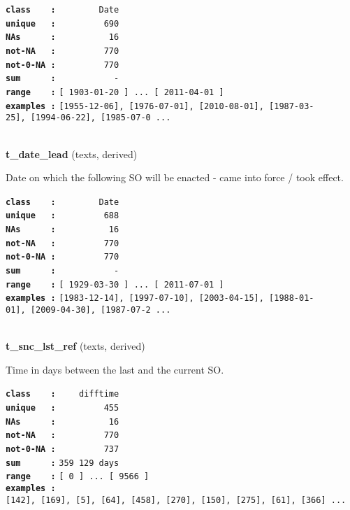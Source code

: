 \documentclass[]{article}
\begin{document}
\textbf{\texttt{class\ \ \ \ :}} \texttt{~~~~~~~~Date}\\
\textbf{\texttt{unique\ \ \ :}} \texttt{~~~~~~~~~690}\\
\textbf{\texttt{NAs\ \ \ \ \ \ :}} \texttt{~~~~~~~~~~16}\\
\textbf{\texttt{not-NA\ \ \ :}} \texttt{~~~~~~~~~770}\\
\textbf{\texttt{not-0-NA\ :}} \texttt{~~~~~~~~~770}\\
\textbf{\texttt{sum\ \ \ \ \ \ :}} \texttt{~~~~~~~~~~~-}\\
\textbf{\texttt{range\ \ \ \ :}}
\texttt{{[}\ 1903-01-20\ {]}\ ...\ {[}\ 2011-04-01\ {]}}\\
\textbf{\texttt{examples\ :}}
\texttt{{[}1955-12-06{]},\ {[}1976-07-01{]},\ {[}2010-08-01{]},\ {[}1987-03-25{]},\ {[}1994-06-22{]},\ {[}1985-07-0\ ...}\\

~

\textbf{t\_date\_lead} (texts, derived)

Date on which the following SO will be enacted - came into force / took
effect.

\textbf{\texttt{class\ \ \ \ :}} \texttt{~~~~~~~~Date}\\
\textbf{\texttt{unique\ \ \ :}} \texttt{~~~~~~~~~688}\\
\textbf{\texttt{NAs\ \ \ \ \ \ :}} \texttt{~~~~~~~~~~16}\\
\textbf{\texttt{not-NA\ \ \ :}} \texttt{~~~~~~~~~770}\\
\textbf{\texttt{not-0-NA\ :}} \texttt{~~~~~~~~~770}\\
\textbf{\texttt{sum\ \ \ \ \ \ :}} \texttt{~~~~~~~~~~~-}\\
\textbf{\texttt{range\ \ \ \ :}}
\texttt{{[}\ 1929-03-30\ {]}\ ...\ {[}\ 2011-07-01\ {]}}\\
\textbf{\texttt{examples\ :}}
\texttt{{[}1983-12-14{]},\ {[}1997-07-10{]},\ {[}2003-04-15{]},\ {[}1988-01-01{]},\ {[}2009-04-30{]},\ {[}1987-07-2\ ...}\\

~

\textbf{t\_snc\_lst\_ref} (texts, derived)

Time in days between the last and the current SO.

\textbf{\texttt{class\ \ \ \ :}} \texttt{~~~~difftime}\\
\textbf{\texttt{unique\ \ \ :}} \texttt{~~~~~~~~~455}\\
\textbf{\texttt{NAs\ \ \ \ \ \ :}} \texttt{~~~~~~~~~~16}\\
\textbf{\texttt{not-NA\ \ \ :}} \texttt{~~~~~~~~~770}\\
\textbf{\texttt{not-0-NA\ :}} \texttt{~~~~~~~~~737}\\
\textbf{\texttt{sum\ \ \ \ \ \ :}} \texttt{359~129\ days}\\
\textbf{\texttt{range\ \ \ \ :}}
\texttt{{[}\ 0\ {]}\ ...\ {[}\ 9566\ {]}}\\
\textbf{\texttt{examples\ :}}
\texttt{{[}142{]},\ {[}169{]},\ {[}5{]},\ {[}64{]},\ {[}458{]},\ {[}270{]},\ {[}150{]},\ {[}275{]},\ {[}61{]},\ {[}366{]}\ ...}\\
\end{document}
